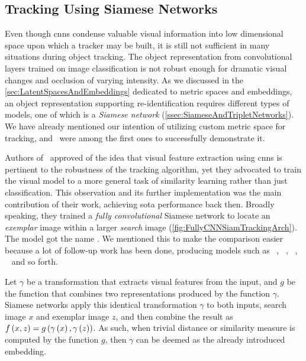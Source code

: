 \subsection{Tracking Using Siamese Networks}
\label{ssec:TrackingUsingSiameseNetworks}

Even though \glspl{cnn} condense valuable visual information into low dimensional space upon which a tracker may be built, it is still not sufficient in many situations during object tracking. The object representation from convolutional layers trained on image classification is not robust enough for dramatic visual changes and occlusion of varying intensity. As we discussed in the \cref{sec:LatentSpacesAndEmbeddings} dedicated to metric spaces and embeddings, an object representation supporting re-identification requires different types of models, one of which is a \emph{Siamese network} (\cref{ssec:SiameseAndTripletNetworks}). We have already mentioned our intention of utilizing custom metric space for tracking, and~\cite{Bertinetto2016} were among the first ones to successfully demonstrate it.

Authors of~\cite{Bertinetto2016} approved of the idea that visual feature extraction using \glspl{cnn} is pertinent to the robustness of the tracking algorithm, yet they advocated to train the visual model to a more general task of similarity learning rather than just classification. This observation and its further implementation was the main contribution of their work, achieving \gls{sota} performance back then. Broadly speaking, they trained a \emph{fully convolutional} Siamese network to locate an \emph{exemplar} image within a larger \emph{search} image (\cref{fig:FullyCNNSiamTrackingArch}). The model got the name . We mentioned this to make the comparison easier because a lot of follow-up work has been done, producing models such as ~\cite{He2018}, ~\cite{Li2018}, ~\cite{Wang2019}, ~\cite{Chen2019} and so forth.

Let $\gamma$ be a transformation that extracts visual features from the input, and $g$ be the function that combines two representations produced by the function $\gamma$. Siamese networks apply this identical transformation $\gamma$ to both inputs, search image $x$ and exemplar image $z$, and then combine the result as ${f} \left( x, z \right) = {g} \left( {\gamma} \left( x \right), {\gamma} \left( z \right) \right)$. As such, when trivial distance or similarity measure is computed by the function $g$, then $\gamma$ can be deemed as the already introduced embedding.

